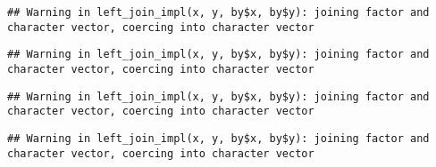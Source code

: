 \documentclass[10pt]{report}
\newenvironment{Shaded}{}{}
\newcommand{\KeywordTok}[1]{\textcolor[rgb]{0.00,0.44,0.13}{\textbf{{#1}}}}
\newcommand{\DataTypeTok}[1]{\textcolor[rgb]{0.56,0.13,0.00}{{#1}}}
\newcommand{\StringTok}[1]{\textcolor[rgb]{0.25,0.44,0.63}{{#1}}}
\newcommand{\NormalTok}[1]{{#1}}
\begin{document}
\begin{verbatim}
## Warning in left_join_impl(x, y, by$x, by$y): joining factor and character vector, coercing into character vector
\end{verbatim}

\begin{verbatim}
## Warning in left_join_impl(x, y, by$x, by$y): joining factor and character vector, coercing into character vector
\end{verbatim}

\begin{Shaded}
\end{Shaded}

\begin{verbatim}
## Warning in left_join_impl(x, y, by$x, by$y): joining factor and character vector, coercing into character vector
\end{verbatim}

\begin{verbatim}
## Warning in left_join_impl(x, y, by$x, by$y): joining factor and character vector, coercing into character vector
\end{verbatim}

\begin{Shaded}
\end{Shaded}
\end{document}
